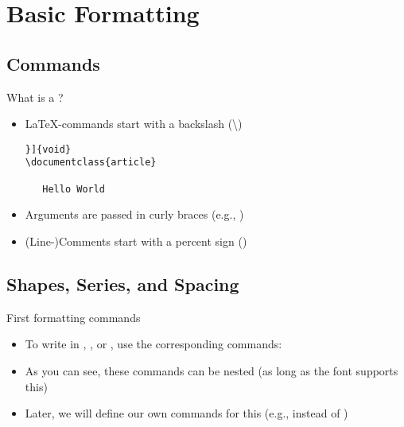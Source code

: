 \section{Basic Formatting}

\subsection{Commands}

\begin{frame}[fragile]{What is a ?}
\begin{itemize}
   \itemsep8pt
   \item \LaTeX-commands start with a backslash (\textbackslash)
{\color{lightgray}\begin{verbatim}}]{void}
\documentclass{article}

   Hello World

\end{verbatim}
}
   \item Arguments are passed in curly braces (e.g., )
   \item (Line-)Comments start with a percent sign (\T{\%})
\end{itemize}
\end{frame}

\subsection{Shapes, Series, and Spacing}

\begin{frame}[fragile]{First formatting commands}
   \begin{itemize}
      \itemsep8pt
      \item To write in , , or , use the corresponding commands:
      \item As you can see, these commands can be nested (as long as the font supports this)
      \item Later, we will define our own commands for this  (e.g.,  instead of )
   \end{itemize}
\end{frame}


